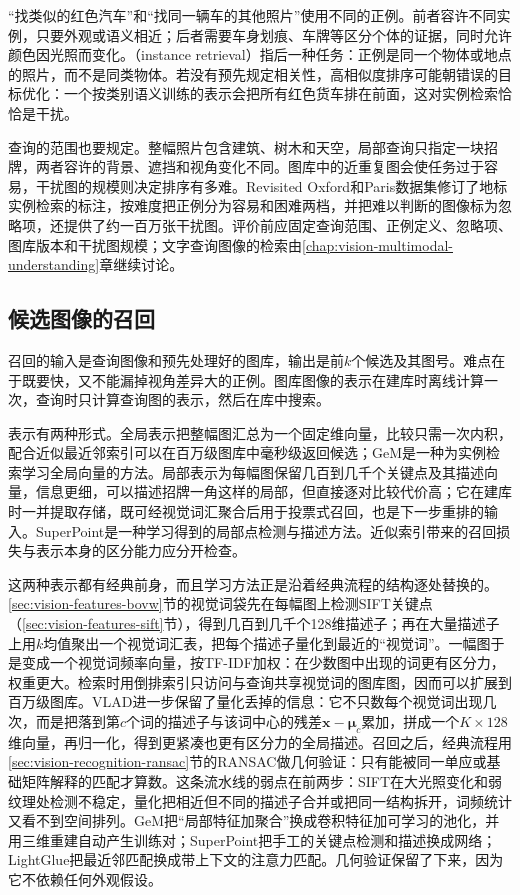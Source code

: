 “找类似的红色汽车”和“找同一辆车的其他照片”使用不同的正例。前者容许不同实例，只要外观或语义相近；后者需要车身划痕、车牌等区分个体的证据，同时允许颜色因光照而变化。（instance retrieval）指后一种任务：正例是同一个物体或地点的照片，而不是同类物体。若没有预先规定相关性，高相似度排序可能朝错误的目标优化：一个按类别语义训练的表示会把所有红色货车排在前面，这对实例检索恰恰是干扰。

查询的范围也要规定。整幅照片包含建筑、树木和天空，局部查询只指定一块招牌，两者容许的背景、遮挡和视角变化不同。图库中的近重复图会使任务过于容易，干扰图的规模则决定排序有多难。Revisited Oxford和Paris数据集修订了地标实例检索的标注，按难度把正例分为容易和困难两档，并把难以判断的图像标为忽略项，还提供了约一百万张干扰图。评价前应固定查询范围、正例定义、忽略项、图库版本和干扰图规模；文字查询图像的检索由\ref{chap:vision-multimodal-understanding}章继续讨论。

\subsection{候选图像的召回}
\label{sec:vision-recognition-candidates}

召回的输入是查询图像和预先处理好的图库，输出是前$k$个候选及其图号。难点在于既要快，又不能漏掉视角差异大的正例。图库图像的表示在建库时离线计算一次，查询时只计算查询图的表示，然后在库中搜索。

表示有两种形式。全局表示把整幅图汇总为一个固定维向量，比较只需一次内积，配合近似最近邻索引可以在百万级图库中毫秒级返回候选；GeM是一种为实例检索学习全局向量的方法。局部表示为每幅图保留几百到几千个关键点及其描述向量，信息更细，可以描述招牌一角这样的局部，但直接逐对比较代价高；它在建库时一并提取存储，既可经视觉词汇聚合后用于投票式召回，也是下一步重排的输入。SuperPoint是一种学习得到的局部点检测与描述方法。近似索引带来的召回损失与表示本身的区分能力应分开检查。

这两种表示都有经典前身，而且学习方法正是沿着经典流程的结构逐处替换的。\ref{sec:vision-features-bovw}节的视觉词袋先在每幅图上检测SIFT关键点（\ref{sec:vision-features-sift}节），得到几百到几千个128维描述子；再在大量描述子上用$k$均值聚出一个视觉词汇表，把每个描述子量化到最近的“视觉词”。一幅图于是变成一个视觉词频率向量，按TF-IDF加权：在少数图中出现的词更有区分力，权重更大。检索时用倒排索引只访问与查询共享视觉词的图库图，因而可以扩展到百万级图库。VLAD进一步保留了量化丢掉的信息：它不只数每个视觉词出现几次，而是把落到第$c$个词的描述子与该词中心的残差$\bm x-\bm\mu_c$累加，拼成一个$K\times128$维向量，再归一化，得到更紧凑也更有区分力的全局描述。召回之后，经典流程用\ref{sec:vision-recognition-ransac}节的RANSAC做几何验证：只有能被同一单应或基础矩阵解释的匹配才算数。这条流水线的弱点在前两步：SIFT在大光照变化和弱纹理处检测不稳定，量化把相近但不同的描述子合并或把同一结构拆开，词频统计又看不到空间排列。GeM把“局部特征加聚合”换成卷积特征加可学习的池化，并用三维重建自动产生训练对；SuperPoint把手工的关键点检测和描述换成网络；LightGlue把最近邻匹配换成带上下文的注意力匹配。几何验证保留了下来，因为它不依赖任何外观假设。

